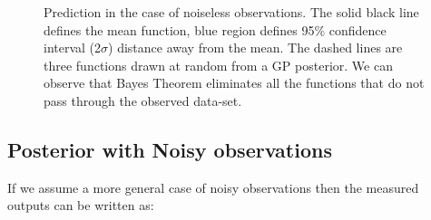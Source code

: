 \begin{figure}[!ht]
  \centering
    \quad
{}\quad
  
       \caption{Prediction in the case of noiseless observations. The solid black line defines the mean function, blue region defines 95\% confidence interval (2$\sigma$) distance away from the mean. The dashed lines are three functions drawn at random from a GP posterior. We can observe that Bayes Theorem eliminates all the functions that do not pass through the observed data-set.}
       \label{figGPNoiseLessPosteriors}
\end{figure}



\subsection{Posterior with Noisy observations}\label{subSecPosteriorNoisy}
If we assume a more general case of noisy observations then the measured outputs can be written as:

